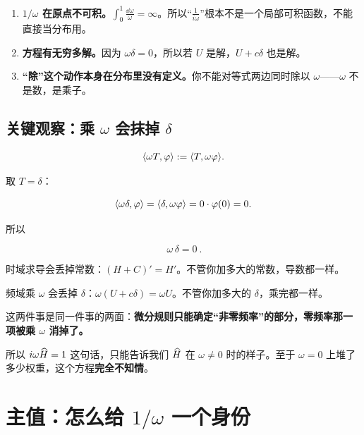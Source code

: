 \begin{warnbox}[这一步有三个洞]
\begin{enumerate}[leftmargin=1.4em,itemsep=0.3em]
\item \textbf{$1/\omega$ 在原点不可积。}$\int_{0}^{1}\frac{\dd\omega}{\omega}=\infty$。所以“$\frac{1}{i\omega}$”根本不是一个局部可积函数，不能直接当分布用。
\item \textbf{方程有无穷多解。}因为 $\omega\delta=0$，所以若 $U$ 是解，$U+c\delta$ 也是解。
\item \textbf{“除”这个动作本身在分布里没有定义。}你不能对等式两边同时除以 $\omega$——$\omega$ 不是数，是乘子。
\end{enumerate}
\end{warnbox}

\subsection{关键观察：乘 $\omega$ 会抹掉 $\delta$}

\begin{equation}
\langle \omega T,\varphi\rangle:=\langle T,\omega\varphi\rangle.
\end{equation}

取 $T=\delta$：

\begin{equation}
\langle \omega\delta,\varphi\rangle=\langle \delta,\omega\varphi\rangle=0\cdot\varphi(0)=0 .
\end{equation}

所以

\begin{equation}
\boxed{\ \omega\,\delta=0\ }.\label{eq:omegadelta0}
\end{equation}

\begin{ideabox}
时域求导会丢掉常数：$(H+C)'=H'$。不管你加多大的常数，导数都一样。

频域乘 $\omega$ 会丢掉 $\delta$：$\omega(U+c\delta)=\omega U$。不管你加多大的 $\delta$，乘完都一样。

这两件事是同一件事的两面：\textbf{微分规则只能确定“非零频率”的部分，零频率那一项被乘 $\omega$ 消掉了。}

所以 $i\omega\widehat{H}=1$ 这句话，只能告诉我们 $\widehat{H}$ 在 $\omega\neq0$ 时的样子。至于 $\omega=0$ 上堆了多少权重，这个方程\textbf{完全不知情}。
\end{ideabox}

\section{主值：怎么给 $1/\omega$ 一个身份}


